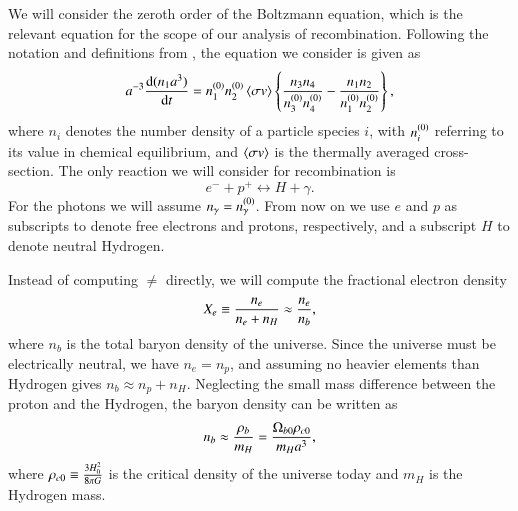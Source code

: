 We will consider the zeroth order of the Boltzmann equation, which is the relevant equation for the scope of our analysis of recombination. Following the notation and definitions from \cite[Eq. (4.5)-(4.9)]{Dodelson}, the equation we consider is given as  
\begin{equation} \label{eq:M2:theory:Boltzmann_equation_four_particles_scale_factor}
    a^{-3}\dv{(n_1 a^3)}{t} = \equilibriumn[1] \equilibriumn[2] \expval{\sigma v} \BBclosed{\frac{n_3 n_4}{\equilibriumn[3] \equilibriumn[4]} - \frac{n_1 n_2}{\equilibriumn[1] \equilibriumn[2]}},
\end{equation}
where $n_i$ denotes the number density of a particle species $i$, with $\equilibriumn[i]$ referring to its value in chemical equilibrium, and $\expval{\sigma v}$ is the thermally averaged cross-section. The only reaction we will consider for recombination is   
\begin{equation} \label{eq:M2:theory:electron_proton_to_hydrogen_photon}
    e^- + p^+ \leftrightarrow H + \gamma.
\end{equation}   
For the photons we will assume $n_\gamma = \equilibriumn[\gamma]$. From now on we use $e$ and $p$ as subscripts to denote free electrons and protons, respectively, and a subscript $H$ to denote neutral Hydrogen. 

Instead of computing $\ne$ directly, we will compute the fractional electron density
\begin{equation} \label{eq:M2:theory:X_e_definition}
    \Xe \equiv \frac{n_e}{n_e + n_H} \approx \frac{\ne}{n_b},
\end{equation}
where $n_b$ is the total baryon density of the universe. Since the universe must be electrically neutral, we have $n_e=n_p$, and assuming no heavier elements than Hydrogen gives $n_b\approx n_p+n_H$. Neglecting the small mass difference between the proton and the Hydrogen, the baryon density can be written as    
\begin{equation} \label{eq:M2:theory:helium_baryon_number_density}
    n_b \approx \frac{\rho_b}{m_H} = \frac{\obn \rhocn}{m_H a^3},
\end{equation}
where $\rhocn\equiv \frac{3 H_0^2}{8\pi G}$ is the critical density of the universe today and $m_H$ is the Hydrogen mass. 

